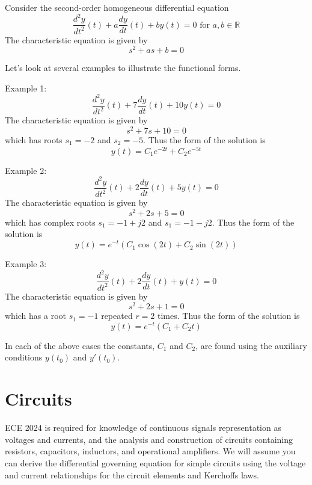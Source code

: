Consider the second-order homogeneous differential equation
\[
\frac{d^2y}{dt^2}(t) + a\frac{dy}{dt}(t) + by(t) = 0 \mbox{ for } a,b \in \mathbb{R}
\]
The characteristic equation is given by
\[
s^2 + as + b = 0
\]

Let's look at several examples to illustrate the functional forms.

Example 1:
\[
\frac{d^2y}{dt^2}(t) + 7\frac{dy}{dt}(t) + 10y(t) = 0 
\]
The characteristic equation is given by
\[
s^2 + 7s + 10 = 0
\]
which has roots $s_1 = -2$ and $s_2 = -5$. Thus the form of the solution is
\[
y(t) = C_1e^{-2t} + C_2e^{-5t}
\]

Example 2:
\[
\frac{d^2y}{dt^2}(t) + 2\frac{dy}{dt}(t) + 5y(t) = 0 
\]
The characteristic equation is given by
\[
s^2 + 2s + 5 = 0
\]
which has complex roots $s_1 = -1+j2$ and $s_1 = -1-j2$. Thus the form of the solution is
\[
y(t) = e^{-t}\left(C_1\cos(2t) + C_2\sin(2t)\right)
\]

Example 3:
\[
\frac{d^2y}{dt^2}(t) + 2\frac{dy}{dt}(t) + y(t) = 0 
\]
The characteristic equation is given by
\[
s^2 + 2s + 1 = 0
\]
which has a root $s_1 = -1$ repeated $r=2$ times. Thus the form of the solution is
\[
y(t) = e^{-t}\left(C_1 + C_2t\right)
\]

In each of the above cases the constants, $C_1$ and $C_2$, are found using the auxiliary conditions $y(t_0)$ and $y\prime(t_0)$.

\section{Circuits}

ECE 2024 is required for knowledge of continuous signals representation as voltages and currents, and the analysis and construction of circuits containing resistors, capacitors, inductors, and operational amplifiers. We will assume you can derive the differential governing equation for simple circuits using the voltage and current relationships for the circuit elements and Kerchoffs laws.

